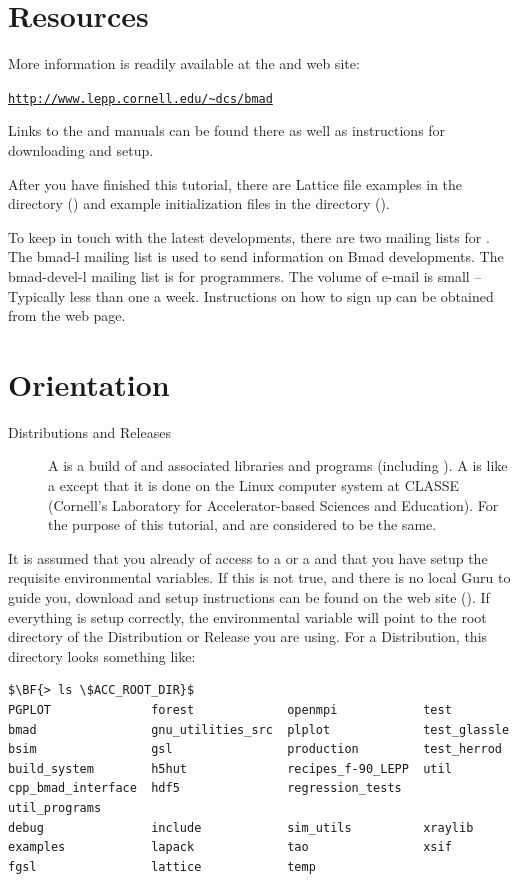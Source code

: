 \documentclass{hitec}
\newcommand{\Section}[1]{\section{#1}\vspace*{-1ex}}
\newenvironment{display}
  {\vspace*{-1.5ex} \begin{alltt}}
  {\end{alltt} \vspace*{-1.0ex}}
\begin{document}
\newpage

\Section{Resources}
\label{s:resources}

More information is readily available at the \bmad and \tao web site:
\begin{display}
  \url{http://www.lepp.cornell.edu/~dcs/bmad}
\end{display}
Links to the \bmad and \tao manuals can be found there as well as instructions for
downloading and setup.

After you have finished this tutorial, there are Lattice file examples in the 
directory () and example \tao initialization files in the 
directory ().

To keep in touch with the latest \bmad developments, there are two mailing lists for
\bmad.  The bmad-l mailing list is used to send information on Bmad developments.  The
bmad-devel-l mailing list is for programmers. The volume of e-mail is small -- Typically
less than one a week. Instructions on how to sign up can be obtained from the \bmad web
page.

\Section{Orientation}
\label{s:orientation}

  \begin{description}
  \item[Distributions and Releases] \Newline
A  is a build of \bmad and associated libraries and programs (including \tao).  A
 is like a  except that it is done on the Linux computer system at
CLASSE (Cornell's Laboratory for Accelerator-based Sciences and Education). For the purpose of this
tutorial,  and  are considered to be the same.
  \end{description}

It is assumed that you already of access to a  or a  and that
you have setup the requisite environmental variables. If this is not true, and there is no
local \bmad Guru to guide you, download and setup instructions can be found on the \bmad web
site (). If everything is setup correctly, the environmental variable
 will point to the root directory of the Distribution or Release you are
using. For a Distribution, this directory looks something like:
{\small
\begin{lstlisting}[mathescape]
$\BF{> ls \$ACC_ROOT_DIR}$
PGPLOT              forest             openmpi            test
bmad                gnu_utilities_src  plplot             test_glassle
bsim                gsl                production         test_herrod
build_system        h5hut              recipes_f-90_LEPP  util
cpp_bmad_interface  hdf5               regression_tests   util_programs
debug               include            sim_utils          xraylib
examples            lapack             tao                xsif
fgsl                lattice            temp
\end{lstlisting}}
\end{document}
